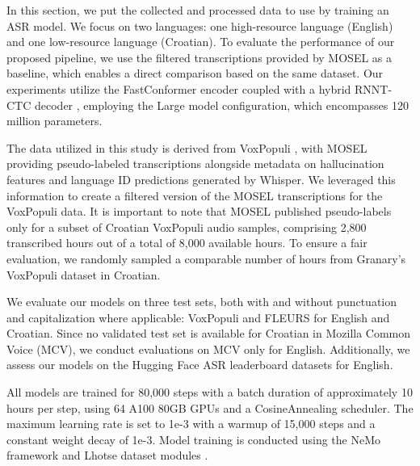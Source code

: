 
In this section, we put the collected and processed data to use by training an ASR model. We focus on two languages: one high-resource language (English) and one low-resource language (Croatian). To evaluate the performance of our proposed pipeline, we use the filtered transcriptions provided by MOSEL \cite{mosel} as a baseline, which enables a direct comparison based on the same dataset. Our experiments utilize the FastConformer encoder \cite{rekesh2023fast} coupled with a hybrid RNNT-CTC decoder \cite{noroozi2023stateful}, employing the Large model configuration, which encompasses 120 million parameters.

The data utilized in this study is derived from VoxPopuli \cite{wang-etal-2021-voxpopuli}, with MOSEL \cite{mosel} providing pseudo-labeled transcriptions alongside metadata on hallucination features and language ID predictions generated by Whisper. We leveraged this information to create a filtered version of the MOSEL transcriptions for the VoxPopuli data. It is important to note that MOSEL published pseudo-labels only for a subset of Croatian VoxPopuli audio samples, comprising 2,800 transcribed hours out of a total of 8,000 available hours. To ensure a fair evaluation, we randomly sampled a comparable number of hours from Granary's VoxPopuli dataset in Croatian.

We evaluate our models on three test sets, both with and without punctuation and capitalization where applicable: VoxPopuli \cite{wang-etal-2021-voxpopuli} and FLEURS \cite{conneau2023fleurs} for English and Croatian. Since no validated test set is available for Croatian in Mozilla Common Voice (MCV), we conduct evaluations on MCV only for English. Additionally, we assess our models on the Hugging Face ASR leaderboard\cite{srivastav2023open} datasets for English.

All models are trained for 80,000 steps with a batch duration of approximately 10 hours per step, using 64 A100 80GB GPUs and a CosineAnnealing scheduler. The maximum learning rate is set to 1e-3 with a warmup of 15,000 steps and a constant weight decay of 1e-3. Model training is conducted using the NeMo framework\cite{nemo_toolkit} and Lhotse dataset modules \cite{zelasko2021lhotse}.



